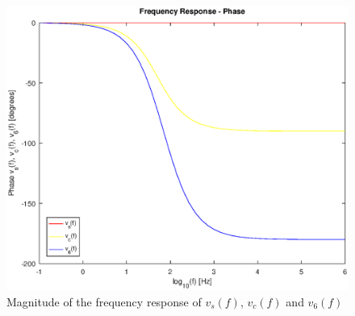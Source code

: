 \begin{figure}[H] \centering
\includegraphics[width=0.8\linewidth]{phase_ang.eps}
\caption{Magnitude of the frequency response of $v_s(f)$, $v_c(f)$ and $v_6(f)$}
\label{fig:phase_theo}
\end{figure}


